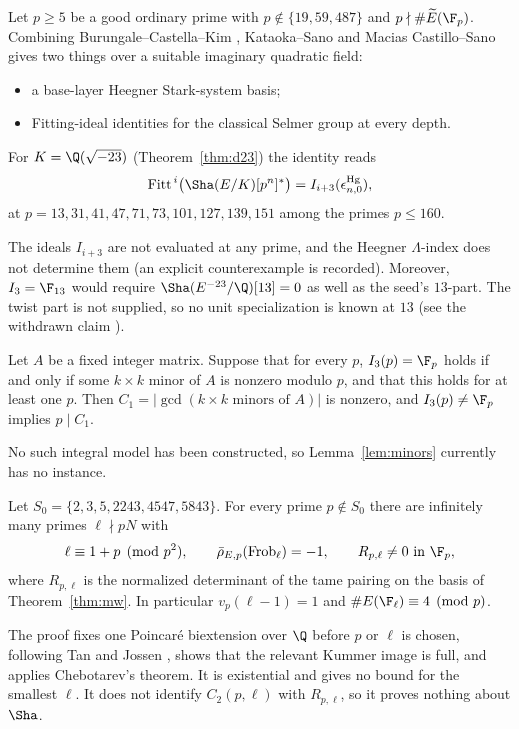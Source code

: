 \begin{researchrecord}\label{thm:mcs}
Let $p\ge5$ be a good ordinary prime with $p\notin\{19,59,487\}$ and $p\nmid\#\widetilde E(\F_p)$. Combining Burungale--Castella--Kim \cite{bck}, Kataoka--Sano and Macias Castillo--Sano \cite{mcs} gives two things over a suitable imaginary quadratic field:
\begin{itemize}[leftmargin=*]
\item a base-layer Heegner Stark-system basis;
\item Fitting-ideal identities for the classical Selmer group at every depth.
\end{itemize}
For $K=\Q(\sqrt{-23})$ (Theorem~\ref{thm:d23}) the identity reads
\[
\mathrm{Fitt}^{\,i}\bigl(\Sha(E/K)[p^n]^*\bigr)=I_{i+3}(\epsilon^{\mathrm{Hg}}_{n,0}),
\]
at $p=13,31,41,47,71,73,101,127,139,151$ among the primes $p\le160$.
\end{researchrecord}
The ideals $I_{i+3}$ are not evaluated at any prime, and the Heegner $\Lambda$-index does not determine them (an explicit counterexample is recorded). Moreover, $I_3=\F_{13}$ would require $\Sha(E^{-23}/\Q)[13]=0$ as well as the seed's $13$-part. The twist part is not supplied, so no unit specialization is known at $13$ (see the withdrawn claim ).

\begin{lemma}\label{lem:minors}
Let $A$ be a fixed integer matrix. Suppose that for every $p$, $I_3(p)=\F_p$ holds if and only if some $k\times k$ minor of $A$ is nonzero modulo $p$, and that this holds for at least one $p$. Then $C_1=|\gcd(\text{$k\times k$ minors of }A)|$ is nonzero, and $I_3(p)\ne\F_p$ implies $p\mid C_1$.
\end{lemma}
No such integral model has been constructed, so Lemma~\ref{lem:minors} currently has no instance.

\begin{researchrecord}\label{thm:g2}
Let $S_0=\{2,3,5,2243,4547,5843\}$. For every prime $p\notin S_0$ there are infinitely many primes $\ell\nmid pN$ with
\[
\ell\equiv1+p\pmod{p^2},\qquad \bar\rho_{E,p}(\mathrm{Frob}_\ell)=-1,\qquad R_{p,\ell}\ne0\ \text{in }\F_p ,
\]
where $R_{p,\ell}$ is the normalized determinant of the tame pairing on the basis of Theorem~\ref{thm:mw}. In particular $v_p(\ell-1)=1$ and $\#E(\F_\ell)\equiv4\pmod p$.
\end{researchrecord}
The proof fixes one Poincar\'e biextension over $\Q$ before $p$ or $\ell$ is chosen, following Tan \cite{tan} and Jossen \cite{jossen}, shows that the relevant Kummer image is full, and applies Chebotarev's theorem. It is existential and gives no bound for the smallest $\ell$. It does not identify $C_2(p,\ell)$ with $R_{p,\ell}$, so it proves nothing about $\Sha$.

